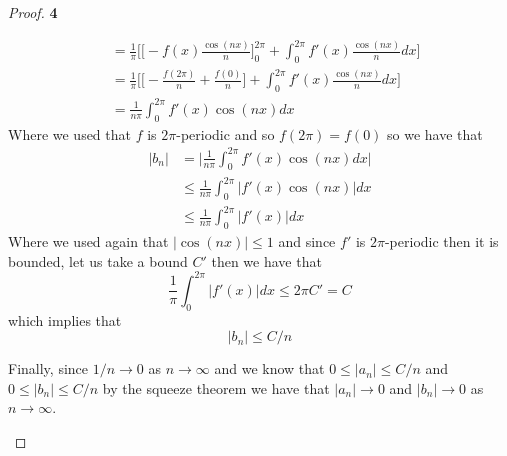 \documentclass[11pt]{article}
\theoremstyle{definition}
\begin{document}
\begin{proof}{\textbf{4}}
\begin{itemize}
\begin{align*}
        &= \frac{1}{\pi}\bigg[\bigg[-f(x)\frac{\cos(nx)}{n}\bigg]_0^{2\pi}
        + \int_0^{2\pi}f'(x) \frac{\cos(nx)}{n} dx\bigg]\\
        &= \frac{1}{\pi}\bigg[\bigg[
            -\frac{f(2\pi)}{n} + \frac{f(0)}{n}
        \bigg]
        + \int_0^{2\pi}f'(x) \frac{\cos(nx)}{n} dx\bigg]\\
        &= \frac{1}{n\pi}\int_0^{2\pi}f'(x) \cos(nx) dx
    \end{align*}
    Where we used that $f$ is $2\pi$-periodic and so $f(2\pi) = f(0)$ so
    we have that
    \begin{align*}
        |b_n| &= \bigg|\frac{1}{n\pi}\int_0^{2\pi}f'(x) \cos(nx) dx\bigg|\\
        &\leq \frac{1}{n\pi}\int_0^{2\pi}|f'(x)\cos(nx)| dx\\
        &\leq \frac{1}{n\pi}\int_0^{2\pi}|f'(x)| dx
    \end{align*}
    Where we used again that $|\cos(nx)| \leq 1$ and since $f'$ is
    $2\pi$-periodic then it is bounded, let us take a bound $C'$ then
    we have that
    $$\frac{1}{\pi}\int_0^{2\pi}|f'(x)| dx \leq 2\pi C' = C$$
    which implies that 
    $$|b_n| \leq C/n$$

    Finally, since $1/n \to 0$ as $n \to \infty$ and we know that
    $0 \leq |a_n| \leq C/n$ and $0 \leq |b_n| \leq C/n$ by the squeeze theorem
    we have that $|a_n| \to 0$ and $|b_n| \to 0$ as $n \to \infty$.


\end{itemize}
\end{proof}
\end{document}
